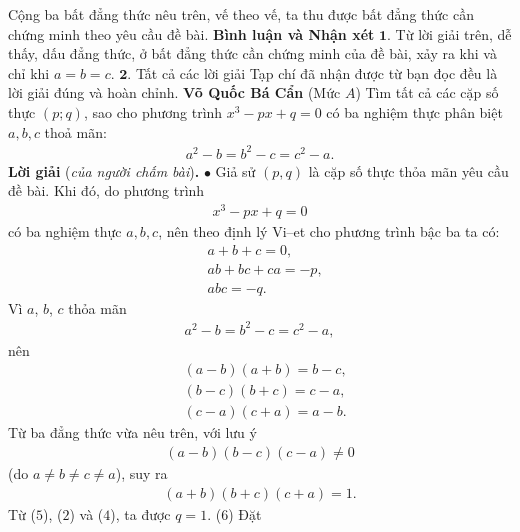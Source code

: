 \begin{multicols}{2}
	Cộng ba bất đẳng thức nêu trên, vế theo vế, ta thu được bất đẳng thức cần chứng minh theo yêu cầu đề bài.
	\vskip 0.05cm
	\textbf{\color{thachthuctoanhoc}Bình luận và Nhận xét}
	\vskip 0.05cm
	$\pmb{1.}$ Từ lời giải trên, dễ thấy, dấu đẳng thức, ở bất đẳng thức cần chứng minh của đề bài, xảy ra khi và chỉ khi $a = b = c$.
	\vskip 0.05cm
	$\pmb{2.}$ Tất cả các lời giải Tạp chí đã nhận được từ bạn đọc đều là lời giải đúng và hoàn chỉnh.
	\vskip 0.1cm
		\hfill\textbf{\color{thachthuctoanhoc}Võ Quốc Bá Cẩn}
	\vskip 0.1cm
	{}
	(Mức $A$) Tìm tất cả các cặp số thực $(p;q)$, sao cho phương trình $x^3-px+q=0$ có ba nghiệm thực phân biệt $a,b,c$  thoả mãn:
	\begin{align*}
		a^2-b=b^2-c=c^2-a.
	\end{align*}
	\textbf{\color{thachthuctoanhoc}Lời giải} (\textit{của người chấm bài})\textbf{\color{thachthuctoanhoc}.}
	\vskip 0.05cm
	$\bullet$ Giả sử $(p, q)$ là cặp số thực thỏa mãn yêu cầu đề bài.
	\vskip 0.05cm
	Khi đó, do phương trình
	\begin{align*}
		{x^3} - px + q = 0 \tag{$1$}
	\end{align*}
	có ba nghiệm thực $a, b, c$, nên theo định lý Vi--et cho phương trình bậc ba ta có:
	\begin{align*}
		&a + b + c = 0, \tag{$2$}\\[-0.5ex]
		&ab + bc + ca = -p,  \tag{$3$}\\[-0.5ex]
		&abc = -q. \tag{$4$}  
	\end{align*}
	Vì $a$, $b$, $c$ thỏa mãn
	\begin{align*}
		{a^2} - b = {b^2} - c = {c^2} - a,
	\end{align*}
	nên
	\begin{align*}
		&\left( {a - b} \right)\left( {a + b} \right) = b - c,\\[-0.5ex]
		&\left( {b - c} \right)\left( {b + c} \right) = c - a,\\[-0.5ex]
		&\left( {c - a} \right)\left( {c + a} \right) = a - b.
	\end{align*}
	Từ ba đẳng thức vừa nêu trên, với lưu ý 
	\begin{align*}
		(a - b)(b - c)(c - a) \ne 0
	\end{align*}
	(do $a \ne b \ne c \ne a$), suy ra
	\begin{align*}
		(a + b)(b + c)(c + a) = 1. \tag{$5$}
	\end{align*}
	Từ ($5$), ($2$) và ($4$), ta được $q = 1$. \hfill ($6$)
	\vskip 0.05cm
	Đặt
	\begin{align*}

\end{align*}
\end{multicols}
